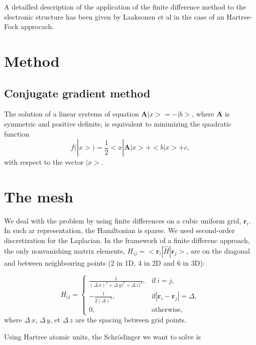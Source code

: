 \documentclass[11pt,a4paper]{article}
\begin{document}
\tableofcontents

A detailled description of the application of the finite difference method to the electronic structure has been given by Laaksonen et al in the case of an Hartree-Fock approcach\cite{laaksonen1986}.

\section{Method}

\subsection{Conjugate gradient method}

The solution of a linear systems of equation $\bm{A}|x>=-|b>$, where $\bm{A}$ is symmetric and positive definite, is equivalent to minimizing the quadratic function
\begin{equation}
  f(|x>)=\frac{1}{2}<x|\bm{A}|x>+<b|x>+c,
\end{equation}
with respect to the vector $|x>$.


\section{The mesh}

We deal with the problem by using finite differences on a cubic uniform grid, ${\bm{r}_i}$.
In such ar representation,  the Hamiltonian is sparse.
We used second-order discretization for the Laplacian. In the framework of a finite differenc approach, the only nonvanishing matrix elements, $H_{ij}=<\bm{r}_i|\hat{H}|\bm{r}_j>$, are on the diagonal and between neighbouring points (2 in 1D, 4 in 2D and 6 in 3D):


  \begin{equation}
    H_{ij}=
    \begin{cases}
      \frac{1}{(\Delta\,x)^2+\Delta\,y)^2+\Delta\,z)^2}, & \text{if}\ i=j, \\
      -\frac{1}{2(\Delta)^2}, & \text{if} |\bm{r}_i-\bm{r}_j|=\Delta,\\
      0,&\text{otherwise,}
    \end{cases}
  \end{equation}
where $\Delta\,x$, $\Delta\,y$, et $\Delta\,z$ are the spacing between grid points.



Using Hartree atomic units, the Schr\"odinger we want to solve is 
\end{document}
